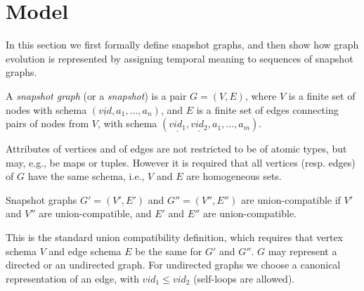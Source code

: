 \section{Model}
\label{sec:model}

In this section we first formally define snapshot graphs, and then
show how graph evolution is represented by assigning temporal meaning
to sequences of snapshot graphs.

\begin{definition}[Snapshot]
A {\em snapshot graph} (or a {\em snapshot}) is a pair $G = (V,E)$,
where $V$ is a finite set of nodes with schema $(\underline{vid},
a_1, \ldots, a_n)$, and $E$ is a finite set of edges connecting
pairs of nodes from $V$, with schema $(\underline{vid_1},
\underline{vid_2}, a_1, \ldots, a_m)$.
\label{def:sg} 
\end{definition}


Attributes of vertices and of edges are not restricted to be of atomic
types, but may, e.g., be maps or tuples. However it is required that
all vertices (resp. edges) of $G$ have the same schema, i.e., $V$ and
$E$ are homogeneous sets.

\begin{definition} 
Snapshot graphs $G' = (V', E')$ and $G'' = (V'', E'')$ are
union-compatible if $V'$ and $V''$ are union-compatible, and $E'$ and
$E''$ are union-compatible.
\label{def:scompat}
\end{definition}

This is the standard union compatibility definition, which requires
that vertex schema $V$ and edge schema $E$ be the same for $G'$ and
$G''$.
%
$G$ may represent a directed or an undirected graph.  For undirected
graphs we choose a canonical representation of an edge, with $vid_1
\leq vid_2$ (self-loops are allowed).

